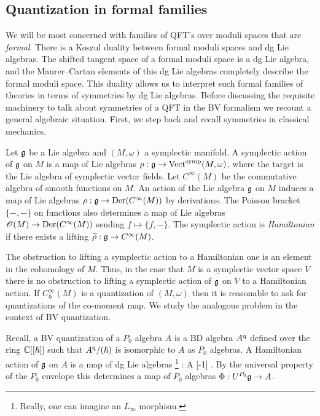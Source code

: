 \subsection{Quantization in formal families}

We will be most concerned with families of QFT's over moduli spaces that are {\em formal}.  
There is a Koszul duality between formal moduli spaces and dg Lie algebras.
The shifted tangent space of a formal moduli space is a dg Lie algebra, and the Maurer--Cartan elements of this dg Lie algebras completely describe the formal moduli space.
This duality allows us to interpret such formal families of theories in terms of symmetries by dg Lie algebras. 
Before discussing the requisite machinery to talk about symmetries of a QFT in the BV formalism we recount a general algebraic situation. 
First, we step back and recall symmetries in classical mechanics. 

Let $\mathfrak g$ be a Lie algebra and $(M, \omega)$ a symplectic manifold. 
A symplectic action of $\mathfrak g$ on $M$ is a map of Lie algebras $\rho : \mathfrak g \to {\rm Vect}^{\rm symp}(M, \omega)$, where the target is the Lie algebra of symplectic vector fields. 
Let $C^\infty(M)$ be the commutative algebra of smooth functions on $M$.
An action of the Lie algebra $\mathfrak g$ on $M$ induces a map of Lie algebras $\rho : \mathfrak g \to {\rm Der}(C^\infty(M))$ by derivations. 
The Poisson bracket $\{-,-\}$ on functions also determines a map of Lie algebras $\mathscr O(M) \to {\rm Der}(C^\infty (M))$ sending $f \mapsto \{f,-\}$. 
The symplectic action is {\em Hamiltonian} if there exists a lifting $\widetilde{\rho} : \mathfrak g \to C^\infty(M)$.

The obstruction to lifting a symplectic action to a Hamiltonian one is an element in the cohomology of $M$. 
Thus, in the case that $M$ is a symplectic vector space $V$ there is no obstruction to lifting a symplectic action of $\mathfrak g$ on $V$ to a Hamiltonian action.
If $C^\infty_\hbar(M)$ is a quantization of $(M,\omega)$ then it is reasonable to ask for quantizations of the co-moment map.
We study the analogous problem in the context of BV quantization. 

Recall, a BV quantization of a $P_0$ algebra $A$ is a BD algebra $A^{\rm q}$ defined over the ring $\mathbb C[[\hbar]]$ such that $A^{\rm q} / (\hbar)$ is isomorphic to $A$ as $P_0$ algebras.
A Hamiltonian action of $\mathfrak g$ on $A$ is a map of dg Lie algebras \footnote{Really, one can imagine an $L_\infty$ morphism.}
\ben
\Phi : \fg \to A [-1] .
\een 
By the universal property of the $P_0$ envelope this determines a map of $P_0$ algebras $\Phi : U^{P_0} \mathfrak g \to A$. 

